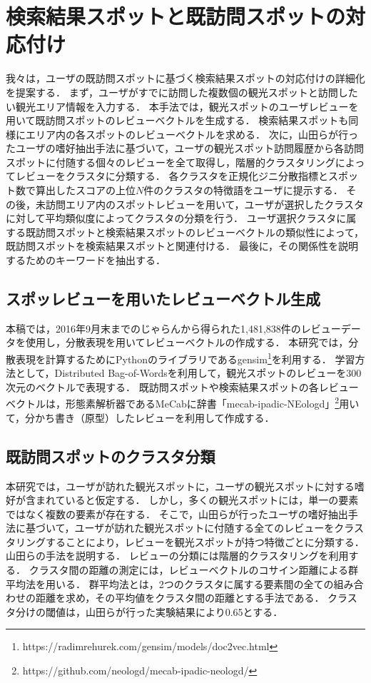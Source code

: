 \documentclass{deimj}
\begin{document}
\section{検索結果スポットと既訪問スポットの対応付け}
\label{sec:検索結果スポットと既訪問スポットの対応付け}
我々は，ユーザの既訪問スポットに基づく検索結果スポットの対応付けの詳細化を提案する．
まず，ユーザがすでに訪問した複数個の観光スポットと訪問したい観光エリア情報を入力する．
本手法では，観光スポットのユーザレビューを用いて既訪問スポットのレビューベクトルを生成する．
検索結果スポットも同様にエリア内の各スポットのレビューベクトルを求める．
次に，山田ら\cite{山田}が行ったユーザの嗜好抽出手法に基づいて，ユーザの観光スポット訪問履歴から各訪問スポットに付随する個々のレビューを全て取得し，階層的クラスタリングによってレビューをクラスタに分類する．
各クラスタを正規化ジニ分散指標とスポット数で算出したスコアの上位$N$件のクラスタの特徴語をユーザに提示する．
その後，未訪問エリア内のスポットレビューを用いて，ユーザが選択したクラスタに対して平均類似度によってクラスタの分類を行う．
ユーザ選択クラスタに属する既訪問スポットと検索結果スポットのレビューベクトルの類似性によって，既訪問スポットを検索結果スポットと関連付ける．
最後に，その関係性を説明するためのキーワードを抽出する．
\subsection{スポッレビューを用いたレビューベクトル生成}
本稿では，2016年9月末までのじゃらんから得られた1,481,838件のレビューデータを使用し，分散表現\cite{doc2vec}を用いてレビューベクトルの作成する．
本研究では，分散表現を計算するためにPythonのライブラリであるgensim\footnote{https://radimrehurek.com/gensim/models/doc2vec.html}を利用する．
学習方法として，Distributed Bag-of-Wordsを利用して，観光スポットのレビューを300次元のベクトルで表現する．
既訪問スポットや検索結果スポットの各レビューベクトルは，形態素解析器であるMeCab\cite{mecab}に辞書「mecab-ipadic-NEologd」\footnote{https://github.com/neologd/mecab-ipadic-neologd/}用いて，分かち書き（原型）したレビューを利用して作成する．
\subsection{既訪問スポットのクラスタ分類}
\label{sub:既訪問スポットのクラスタ分類}
本研究では，ユーザが訪れた観光スポットに，ユーザの観光スポットに対する嗜好が含まれていると仮定する．
しかし，多くの観光スポットには，単一の要素ではなく複数の要素が存在する．
そこで，山田ら\cite{山田}が行ったユーザの嗜好抽出手法に基づいて，ユーザが訪れた観光スポットに付随する全てのレビューをクラスタリングすることにより，レビューを観光スポットが持つ特徴ごとに分類する．
山田らの手法を説明する．
レビューの分類には階層的クラスタリングを利用する．
クラスタ間の距離の測定には，レビューベクトルのコサイン距離による群平均法を用いる．
群平均法とは，2つのクラスタに属する要素間の全ての組み合わせの距離を求め，その平均値をクラスタ間の距離とする手法である．
クラスタ分けの閾値は，山田らが行った実験結果により0.65とする．
\end{document}

